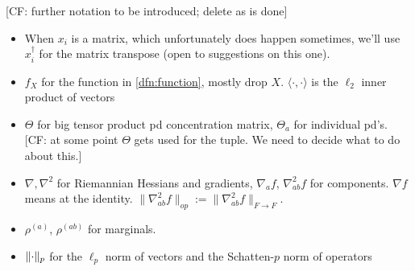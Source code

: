 \documentclass{article}
\DeclarePairedDelimiter{\norm}{\lVert}{\rVert}
\renewcommand{\vec}{\bm}
\newcommand\SL{\operatorname{SL}}
\newcommand\PD{\operatorname{P}}
\newcommand\Sym{\mathcal{S}}
\newcommand\smallSym{S}
\newcommand\SPD{\mathcal{P}}
\newcommand\samp{x}
\newcommand\rv{X}
\newcommand{\CF}[1]{{\color{purple}[CF: #1]}}
\newcommand{\MW}[1]{{\color{red}[MW: #1]}}
\begin{document}
\CF{further notation to be introduced; delete as is done}
\begin{itemize}

\item When $x_i$ is a matrix, which unfortunately does happen sometimes, we'll use $x_i^\dagger$ for the matrix transpose (open to suggestions on this one).
\item $f_{\rv}$ for the function in \cref{dfn:function}, mostly drop $\rv$. $\langle \cdot, \cdot \rangle$ is the $\ell_2$ inner product of vectors

\item $\Theta$ for big tensor product pd concentration matrix, $\Theta_a$ for individual pd's. \CF{at some point $\Theta$ gets used for the tuple. We need to decide what to do about this.}

\item $\nabla, \nabla^2$ for Riemannian Hessians and gradients, $\nabla_a f$, $\nabla^2_{ab} f$ for components. $\nabla f$ means at the identity. $\|\nabla^2_{ab}f\|_{op}:=\|\nabla^2_{ab}f\|_{F\to F}$.
\item $\rho^{(a)}$, $\rho^{(ab)}$ for marginals.
\item $\norm{\cdot}_p$ for the $\ell_p$ norm of vectors and the Schatten-$p$ norm of operators
\end{itemize}
\end{document}
